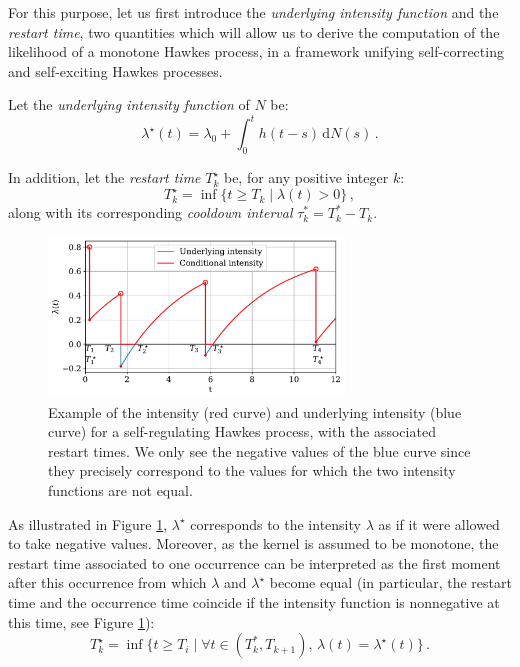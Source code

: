For this purpose, let us first introduce the \emph{underlying intensity function} and the \emph{restart time}, two quantities which will allow us to
derive the computation of the likelihood of a monotone Hawkes process, in a framework unifying self-correcting and self-exciting Hawkes processes.

\begin{definition}
Let the \emph{underlying intensity function} of $N$ be:
\begin{equation*}
    \lambda^\star(t) = \lambda_0 + \int_{0}^{t}{h(t-s)\,\mathrm{d}N(s)}\,.
\end{equation*}

In addition, let the \emph{restart time} $T_k^\star$ be, for any positive integer $k$:
\begin{equation*}
    T_k^\star = \inf{\{t\geq T_k\mid \lambda(t) > 0\}}\,,
\end{equation*}
along with its corresponding \emph{cooldown interval} $\tau_k^* = T_k^* - T_k$.
\label{def:chap1_underlying}
\end{definition}

\begin{figure}[!ht]
  \centering
  \includegraphics[width=0.7\textwidth]{images/chapter2/cooldownTimesMarkedSerif2.pdf}  %
  \caption{Example of the intensity (red curve) and underlying intensity (blue curve) for a self-regulating Hawkes process, with the associated restart times. We only see the negative values of the blue curve since they precisely correspond to the values for which the two intensity functions are not equal.
  }
  \label{fig:chap1_underlying_intensity}
\end{figure}

As illustrated in Figure \ref{fig:chap1_underlying_intensity}, $\lambda^\star$ corresponds to the intensity $\lambda$ as if it were allowed to take negative values.
Moreover, as the kernel is assumed to be monotone, the restart time associated to one occurrence can be interpreted as the first moment after this occurrence from which $\lambda$ and $\lambda^\star$ become equal  (in particular, the restart time and the occurrence time coincide if the intensity function is nonnegative at this time, see Figure \ref{fig:chap1_underlying_intensity}):
\begin{equation*}
    T_k^\star = \inf{\{t\geq T_i\mid \forall t\in(T_k^*,T_{k+1}),\, \lambda(t) = \lambda^\star(t)\}}\,.
\end{equation*}

